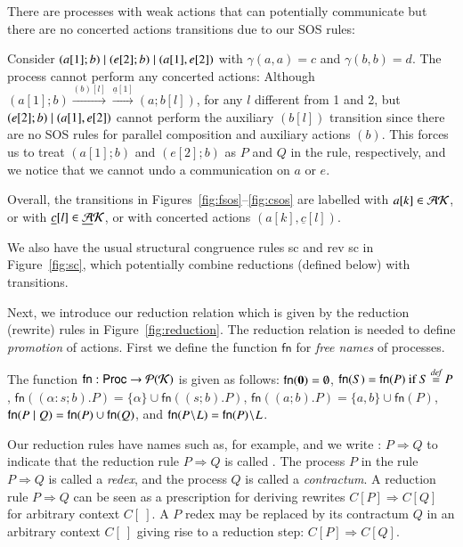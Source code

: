 There are processes with weak actions that can potentially communicate but there are no concerted actions 
transitions due to our SOS rules:

\begin{example}\label{ex:examp3}
{\rm Consider $(a[1];b)\; \vert \; (e[2];b)\; \vert \; (a[1],e[2])$ with $\gamma(a,a)=c$ and $\gamma(b,b)=d$.
The process cannot perform any concerted actions: Although $(a[1];b)  \xrightarrow{(b)[l]} 
\xrightarrow{\underline{a}[1]} (a;b[l])$, for any $l$ different from 1 and 2, but
$(e[2];b)\; \vert \; (a[1],e[2])$  cannot perform the auxiliary $(b[l])$
transition since there are no SOS rules for parallel composition and auxiliary actions $(b)$. This forces us
to treat $(a[1];b)$ and $ (e[2];b)$ as $P$ and $Q$ in the  rule, respectively, and we notice that
we cannot undo a communication on $a$ or $e$.}
\end{example}

Overall, the transitions in Figures~\ref{fig:fsos}--\ref{fig:csos} are labelled with $a[k] \in \mathcal{AK}$, or with 
$\underline{c}[l] \in \underline{\mathcal{A}}\mathcal{K}$, or with concerted actions $(a[k], \underline{c}[l])$.

We also have the usual structural congruence rules 
sc and rev sc in Figure~\ref{fig:sc}, 
which potentially combine reductions (defined below) with transitions.

Next, we introduce our reduction relation which is given by the reduction (rewrite) rules 
in Figure~\ref{fig:reduction}. The reduction relation is needed to define {\em promotion} 
of actions. First we define the function $\mathsf{fn}$ for {\em free names} of processes.

\begin{definition} \normalfont 
The function $\mathsf{fn}: \mathsf{Proc} \rightarrow \mathcal{P}(\mathcal{K})$ is given as follows: 
$\mathsf{fn}(\mathbf{0}) = \emptyset$,
$\mathsf{fn}(S)=\mathsf{fn}(P) \text{ if }  S\stackrel{\emph{def}}{=} P$, $\mathsf{fn}((\alpha : s;b).P)=\{\alpha\} \cup 
\mathsf{fn}((s;b).P)$, $\mathsf{fn}((a;b).P)=\{a,b\} \cup \mathsf{fn}(P) $, $\mathsf{fn}(P\; \vert \; Q)=\mathsf{fn}(P) \cup \mathsf{fn}(Q)$, and $\mathsf{fn}(P \!\setminus\!L)=\mathsf{fn}(P) \!\setminus\!L$.
\end{definition}

\noindent
Our reduction rules have names such as, for example,  and we write 
: $P \Rightarrow Q$
to indicate that the reduction rule $P \Rightarrow Q$ is called . 
The process $P$ in the rule
$P\Rightarrow Q$ is called a \emph{redex}, and the process $Q$ is called a \emph{contractum}. 
A reduction rule $P\Rightarrow Q$ can be seen as a prescription 
for deriving rewrites $C[P] \Rightarrow C[Q]$ for arbitrary context $C[\ ]$. 
A $P$ redex may be replaced by its contractum $Q$ in an arbitrary context 
$C[\ ]$ giving rise to a reduction step: $C[P] \Rightarrow C[Q]$.

